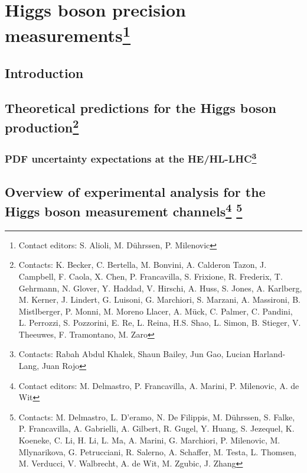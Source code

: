 \documentclass[../report.tex]{subfiles}
\providecommand{\main}{..}
\begin{document}
\section[Higgs boson precision measurements]{Higgs boson precision measurements\footnote{Contact editors: S. Alioli, M. D\"uhrssen, P. Milenovic}\label{sec2}}
\subsection{Introduction}
\label{sec2:introduction}


\subsection[Theoretical predictions for the Higgs boson production]{Theoretical predictions for the Higgs boson production\footnote{Contacts: K. Becker, C. Bertella, M. Bonvini, A. Calderon Tazon, J. Campbell, F. Caola, X. Chen,
P. Francavilla, S. Frixione, R. Frederix, T. Gehrmann, N. Glover, Y. Haddad, V. Hirschi, A. Huss, S. Jones, 
A. Karlberg, M. Kerner, J. Lindert, G. Luisoni, G. Marchiori, S. Marzani, A. Massironi, B. Mistlberger,
P. Monni, M. Moreno Llacer, A. M\"uck, C. Palmer, C. Pandini, L. Perrozzi, S. Pozzorini, E. Re, L. Reina,
H.S. Shao, L. Simon, B. Stieger, V. Theeuwes, F. Tramontano, M. Zaro}
}
\label{sec2_HXSWG1}


\subsubsection[PDF uncertainty expectations at the HE/HL-LHC]{PDF uncertainty expectations at the HE/HL-LHC\footnote{Contacts: Rabah Abdul Khalek, Shaun Bailey, Jun Gao, Lucian Harland-Lang,  Juan Rojo}}
\label{sec2:PDFuncertainties}


\subsection[Overview of experimental analysis for the Higgs boson measurement channels]{Overview of experimental analysis for the Higgs boson measurement channels\footnote{Contact editors: M. Delmastro, P. Francavilla, A. Marini, P. Milenovic, A. de Wit}
\footnote{Contacts: M. Delmastro, L. D'eramo, N. De Filippis, M. D\"uhrssen, S. Falke, P. Francavilla, A. Gabrielli, A. Gilbert, R. Gugel, Y. Huang, S. Jezequel, K. Koeneke, C. Li, H. Li, L. Ma, A. Marini, G. Marchiori, P. Milenovic, M. Mlynarikova, G. Petrucciani, R. Salerno, A. Schaffer, M. Testa, L. Thomsen, M. Verducci, V. Walbrecht, A. de Wit, M. Zgubic, J. Zhang}}
\label{sec2:expan}
\label{sec2:channels}

\end{document}
